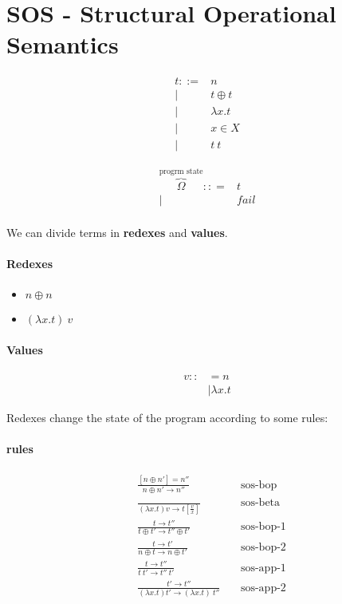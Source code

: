 \documentclass{article}
\begin{document}
\section{SOS - Structural Operational Semantics}
\begin{align*}
t ::=& n \\
    |& t \oplus t \\
    |& \lambda x.t \\
    |& x\in X \\
    |& t\ t
\end{align*}

\begin{align*}
    \overbrace{\Omega}^\text{progrm state} :: =& t \\
                                               |&fail \\
\end{align*}

We can divide terms in \textbf{redexes} and \textbf{values}.
\paragraph{Redexes}
\begin{itemize}
    \item $n\oplus n$
    \item $(\lambda x.t)\ v$
\end{itemize}

\paragraph{Values}
\begin{align*}
    v ::&= n \\
        &| \lambda x.t
\end{align*}

Redexes change the state of the program according to some rules:
\paragraph{rules}
\begin{align*} 
    &\frac{[n\oplus n'] = n''}{n\oplus n'\to n''} &&\text{sos-bop} \\
    &\frac{}{(\lambda x.t) v\to t[\frac v x]}\ &&\text{sos-beta} \\
    &\frac{t\to t''}{t\oplus t' \to t''\oplus t'} &&\text{sos-bop-1} \\
    &\frac{t\to t'}{n\oplus t \to n\oplus t'} &&\text{sos-bop-2} \\
    &\frac{t\to t''}{t\ t' \to t''\ t'}\ &&\text{sos-app-1} \\
    &\frac{t'\to t''}{(\lambda x.t) t'\to (\lambda x.t)\ t''}\ &&\text{sos-app-2} \\
\end{align*}
\end{document}
